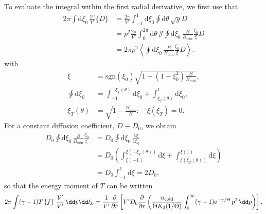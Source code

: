 \documentclass{notes}
\newcommand{\ee}{\mathrm{e}}
\newcommand{\ncold}{n_{\rm cold}}
\newcommand{\Vp}{\mathcal{V}'}
\newcommand{\VpVol}{V'}
\begin{document}
    To evaluate the integral within the first radial derivative, we first use
    that
    \begin{equation}
        \begin{aligned}
            2\pi \int\mathrm{d} \xi_0 \,\frac{\mathcal{V}'}{V'} \{D\} &=
            \frac{2\pi}{V'}\int_{-1}^1\mathrm{d} \xi_0  \oint \mathrm{d} \theta \,\sqrt{g}D\\
            &= p^2\frac{2\pi}{V'}\int_{0}^{2\pi}\mathrm{d} \theta  \, \mathcal{J} \oint \mathrm{d} \xi_0 \,\frac{B}{B_\mathrm{min}}\frac{\xi_0}{\xi}D\\
            &= 2\pi p^2 \left\langle \oint \mathrm{d} \xi_0 \,\frac{B}{B_\mathrm{min}}\frac{\xi_0}{\xi}D \right\rangle.
        \end{aligned}
    \end{equation}
    with
    \begin{equation}
        \begin{aligned}
            \xi &= \mathrm{sgn}(\xi_0)\sqrt{1-(1-\xi_0^2)\frac{B}{B_\mathrm{min}}}, \\
            \oint \mathrm{d} \xi_0 &= \int_{-1}^{-\xi_T(\theta)} \mathrm{d}\xi_0+ \int_{\xi_T(\theta)}^1 \mathrm{d}\xi_0,\\
            \xi_T(\theta) &= \sqrt{1-\frac{B_\mathrm{min}}{B}}: \quad \xi(\xi_T) = 0.
        \end{aligned}
    \end{equation}
    For a constant diffusion coefficient, $D\equiv D_0$, we obtain
    \begin{equation}
        \begin{aligned}
            D_0 \oint \mathrm{d} \xi_0 \,\frac{B}{B_\mathrm{min}}\frac{\xi_0}{\xi} &= D_0 \oint \mathrm{d} \xi_0 \,\frac{\partial \xi}{\partial \xi_0} \nonumber \\
            &= D_0 \left( \int_{\xi(-1)}^{\xi(-\xi_T(\theta))} \mathrm{d}\xi + \int_{\xi(\xi_T(\theta))}^{\xi(1)} \mathrm{d}\xi \right) \nonumber \\
            &= D_0 \int_{-1}^1 \mathrm{d}\xi = 2D_0,
        \end{aligned}
    \end{equation}
    so that the energy moment of $T$ can be written
    \begin{equation}
        2\pi\int(\gamma-1) T\left\{f\right\}\,\frac{\Vp}{\VpVol}\,\dd p\dd\xi_0 =
            \frac{1}{\VpVol}\frac{\partial}{\partial r}\left[
                \VpVol D_0\frac{\partial}{\partial r} \left(
                    \frac{\ncold}{\Theta K_2(1/\Theta)} \int_0^\infty (\gamma-1) \ee^{-\gamma/\Theta}\,p^2\,\dd p
                \right)
            \right].
    \end{equation}
\end{document}
